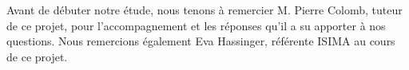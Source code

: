 
Avant de débuter notre étude, nous tenons à remercier M. Pierre Colomb, tuteur de ce projet, pour l'accompagnement et les réponses qu'il a su apporter à nos questions. Nous remercions également Eva Hassinger, référente ISIMA au cours de ce projet.
